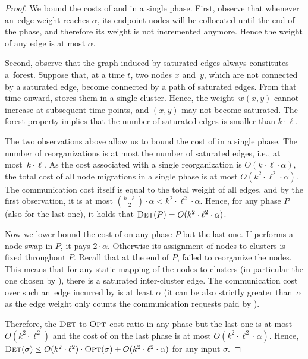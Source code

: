 \begin{proof}
We bound the costs of \DET and \OPT in a single phase. First, observe that
whenever an~edge weight reaches $\alpha$, its endpoint nodes will be collocated 
until the end of the phase, and therefore its weight is not
incremented anymore. Hence the weight of any edge is at most $\alpha$.

Second, observe that the graph induced by saturated edges always constitutes 
a~forest. Suppose that, at a time $t$,
two nodes $x$ and~$y$, which are not
connected by a saturated edge, become connected by a path of saturated edges.
From that time onward, \DET stores them in a single cluster. Hence, the
weight~$w(x,y)$ cannot increase at subsequent time points, and $(x,y)$ may
not become saturated. The forest property implies that the number of saturated
edges is smaller than $k \cdot \ell$.

The two observations above allow us to bound the cost of \DET in a single
phase. The number of reorganizations is at most the number of saturated edges,
i.e., at most~$k \cdot \ell$. As the cost associated with a single
reorganization is $O(k \cdot \ell \cdot \alpha)$, the total cost of all node
migrations in a single phase is at most $O(k^2 \cdot \ell^2 \cdot \alpha)$.
The communication cost itself is equal to the total weight of all edges, and
by the first observation, it is at most $\binom{k \cdot \ell}{2}
\cdot \alpha < k^2 \cdot \ell^2 \cdot \alpha$. Hence, for any phase $P$ (also
for the last one), it holds that $\textsc{Det}(P) = O(k^2 \cdot \ell^2 \cdot \alpha)$.

Now we lower-bound the cost of \OPT on any phase $P$ but the last one. If \OPT
performs a node swap in $P$, it pays $2 \cdot \alpha$. Otherwise its assignment of
nodes to clusters is fixed throughout $P$. Recall that at the end of $P$, \DET
failed to reorganize the nodes. This means that for any static mapping of the
nodes to clusters (in particular the one chosen by \OPT), there is a
saturated inter-cluster edge. The communication cost over such an~edge incurred
by \OPT is at least $\alpha$ (it can be also strictly greater than~$\alpha$ as
the edge weight only counts the communication requests paid by \DET).

Therefore, the $\textsc{Det}$-to-$\textsc{Opt}$ cost ratio in any phase but the last one is at
most $O(k^2 \cdot \ell^2)$ and the cost of \DET on the last phase is at
most $O(k^2 \cdot \ell^2 \cdot \alpha)$. Hence,
$\textsc{Det}(\sigma) \leq O(k^2 \cdot \ell^2) \cdot \textsc{Opt}(\sigma) + O(k^2 \cdot
\ell^2 \cdot \alpha)$ for any input $\sigma$.
\end{proof}


